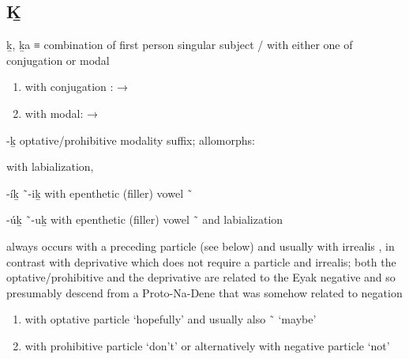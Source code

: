 \subsection{Ḵ}\label{sec:alphalist-kh}
\begin{morphdesc}[resume*=alphalist]
\item[ḵ, ḵa]
	≡ 
	combination of first person singular subject  /  with either one of
		conjugation 
		or modal 
	\begin{enumerate}
	\item	with conjugation :  → 
	\item	with modal:  → 
	\end{enumerate}

\item[-ḵ]\label{m:-ḵ-optphib}
	optative/prohibitive modality suffix;
	\newline
	allomorphs:
	\begin{allolist}
	\item[{\X[-ḵw-optphib]{-ḵw}}]
		 	with labialization,
	\item[-íḵ \~\ -iḵ] with epenthetic (filler) vowel  \~\ 
	\item[-úḵ \~\ -uḵ] with epenthetic (filler) vowel  \~\  and labialization
	\end{allolist}
	always occurs with a preceding particle (see below) and usually with irrealis ,
	in contrast with deprivative  which does not require a particle and irrealis;
	both the optative/prohibitive and the deprivative are related to 
		the Eyak negative 
		and so presumably descend from a Proto-Na-Dene  
		that was somehow related to negation
		\parencites{leer:2000b}[872, 876]{crippen:2019}
	\begin{enumerate}
	\item	with optative particle  ‘hopefully’
			and usually also  \~\  ‘maybe’
	\item	with prohibitive particle  ‘don’t’
			or alternatively with negative particle  ‘not’
	\end{enumerate}


\end{morphdesc}
